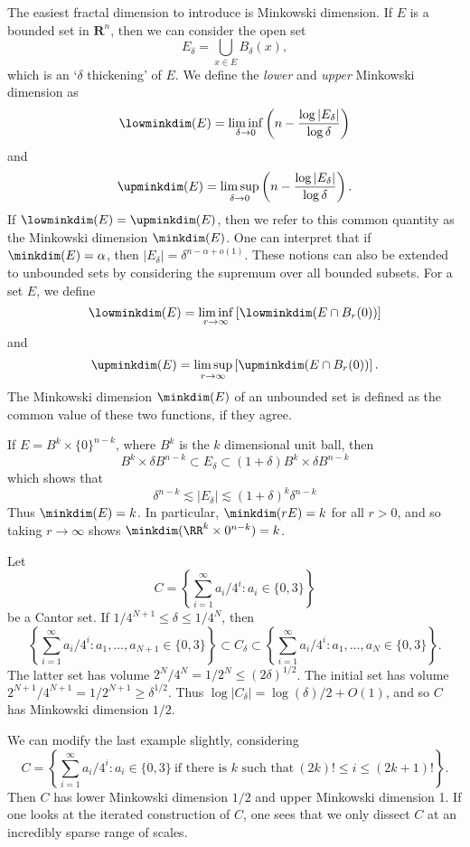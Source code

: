 The easiest fractal dimension to introduce is Minkowski dimension. If $E$ is a bounded set in $\mathbf{R}^n$, then we can consider the open set
%
\[ E_\delta = \bigcup_{x \in E} B_\delta(x),\]
%
which is an `$\delta$ thickening' of $E$. We define the \emph{lower} and \emph{upper} Minkowski dimension as
%
\[ \lowminkdim(E) = \liminf_{\delta \to 0} \left( n - \frac{\log|E_\delta|}{\log \delta} \right) \]
%
and
%
\[ \upminkdim(E) = \limsup_{\delta \to 0} \left( n - \frac{\log|E_\delta|}{\log \delta} \right). \]
%
If $\lowminkdim(E) = \upminkdim(E)$, then we refer to this common quantity as the Minkowski dimension $\minkdim(E)$. One can interpret that if $\minkdim(E) = \alpha$, then $|E_\delta| = \delta^{n - \alpha + o(1)}$. These notions can also be extended to unbounded sets by considering the supremum over all bounded subsets. For a set $E$, we define
%
\[ \lowminkdim(E) = \liminf_{r \to \infty} \left[ \lowminkdim(E \cap B_r(0)) \right] \]
%
and
%
\[ \upminkdim(E) = \limsup_{r \to \infty} \left[ \upminkdim(E \cap B_r(0)) \right]. \]
%
The Minkowski dimension $\minkdim(E)$ of an unbounded set is defined as the common value of these two functions, if they agree.

\begin{example}
	If $E = B^k \times \{ 0 \}^{n-k}$, where $B^k$ is the $k$ dimensional unit ball, then
	\[ B^k \times \delta B^{n-k} \subset E_\delta \subset (1 + \delta)B^k \times \delta B^{n-k} \]
	which shows that
	\[ \delta^{n-k} \lesssim |E_\delta| \lesssim (1 + \delta)^k \delta^{n-k} \]
	Thus $\minkdim(E) = k$. In particular, $\minkdim(r E) = k$ for all $r > 0$, and so taking $r \to \infty$ shows $\minkdim(\RR^k \times 0^{n-k}) = k$.
\end{example}

\begin{example}
	Let
	\[ C = \left\{ \sum_{i = 1}^\infty a_i/4^i : a_i \in \{ 0, 3 \} \right\} \]
	be a Cantor set. If $1/4^{N+1} \leq \delta \leq 1/4^N$, then
	\[ \left\{ \sum_{i = 1}^\infty a_i/4^i : a_1, \dots, a_{N+1} \in \{ 0, 3 \} \right\} \subset C_\delta \subset \left\{ \sum_{i = 1}^\infty a_i/4^i : a_1, \dots, a_N \in \{ 0, 3 \} \right\}. \]
	The latter set has volume $2^N/4^N = 1/2^N \leq (2\delta)^{1/2}$. The initial set has volume $2^{N+1}/4^{N+1} = 1/2^{N+1} \geq \delta^{1/2}$. Thus $\log |C_\delta| = \log(\delta) / 2 + O(1)$, and so $C$ has Minkowski dimension $1/2$.
\end{example}

\begin{example}
	We can modify the last example slightly, considering
	\[ C = \left\{ \sum_{i = 1}^\infty a_i/4^i : a_i \in \{ 0, 3 \}\ \text{if there is $k$ such that}\ (2k)! \leq i \leq (2k+1)! \right\}. \]
	Then $C$ has lower Minkowski dimension $1/2$ and upper Minkowski dimension 1. If one looks at the iterated construction of $C$, one sees that we only dissect $C$ at an incredibly sparse range of scales.
\end{example}

